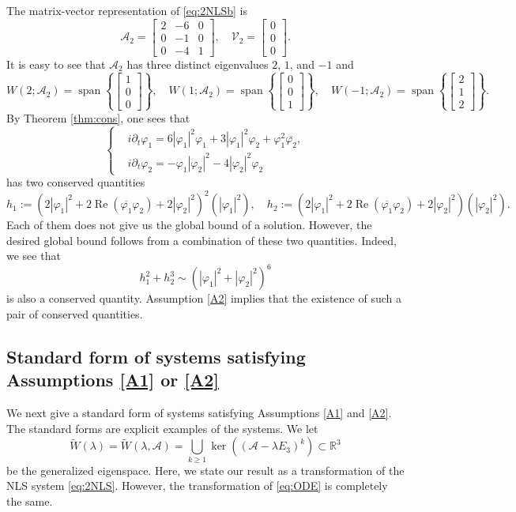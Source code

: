 \documentclass[11pt,a4paper,twosides]{amsart}
\theoremstyle{plain}
\theoremstyle{remark}
\numberwithin{equation}{section}
\newcommand{\R}{\mathbb{R}}
\renewcommand{\Re}{\operatorname{Re}}
\def\ge{\geqslant}
\DeclareMathOperator{\Span}{span}
\theoremstyle{definition}
\newcommand{\1}{{\bf 1}_{\{|x| < |t|\}}}
\newcommand{\ol}{\overline}
\renewcommand{\tilde}{\widetilde}
\begin{document}
The matrix-vector representation of \eqref{eq:2NLSb} is
\[
	\mathscr{A}_2=\begin{bmatrix}
	2 & -6 & 0 \\
	0 & -1 & 0 \\
	0 & -4 & 1
	\end{bmatrix}, \quad
	\mathscr{V}_2 = \begin{bmatrix} 0 \\ 0 \\ 0 \end{bmatrix}.
\]
It is easy to see that $\mathscr{A}_2$ has three distinct eigenvalues $2$, $1$, and $-1$ and
\[
	W(2;\mathscr{A}_2)= \Span \left\{
	\begin{bmatrix} 1 \\ 0 \\ 0 \end{bmatrix}\right\}, \quad
	W(1;\mathscr{A}_2)= \Span \left\{
	\begin{bmatrix} 0 \\ 0 \\ 1 \end{bmatrix}\right\}, \quad
	W(-1;\mathscr{A}_2)= \Span \left\{
	\begin{bmatrix} 2 \\ 1 \\ 2 \end{bmatrix}\right\}.
\]
By Theorem \ref{thm:cons}, one sees that
\[
 \left\{
  \begin{aligned}
     & i\partial_t \varphi_1  =
    6|\varphi_1|^2\varphi_1 +3|\varphi_1|^2\varphi_2 +\varphi_1^2\ol{\varphi_2},  \\
     & i\partial_t \varphi_2  =
    -\varphi_1|\varphi_2|^2 - 4 |\varphi_2|^2 \varphi_2
    \end{aligned}
  \right.
 \]
has two conserved quantities
\[
	h_1:=(2|\varphi_1|^2 + 2\Re (\overline{\varphi_1}\varphi_2)+ 2|\varphi_2|^2)^2(|\varphi_1|^2), \quad h_2:=(2|\varphi_1|^2 + 2\Re (\overline{\varphi_1}\varphi_2)+ 2|\varphi_2|^2)
	(|\varphi_2|^2).
\]
Each of them does not give us 
the global bound of a solution.
However, the desired global bound follows from
a combination of these two quantities.
Indeed, we see that
\[
	h_1^2 + h_2^3 \sim (|\varphi_1|^2+|\varphi_2|^2)^6
\]
is also a conserved quantity.
Assumption \ref{A2} implies that the existence of such a pair of conserved quantities.

\subsection{Standard form of systems satisfying Assumptions \ref{A1} or \ref{A2}}
We next give a standard form of systems
satisfying Assumptions \ref{A1} and \ref{A2}.
The standard forms are explicit examples of the systems.
We let
\[
	\tilde{W}(\lambda) = \tilde{W}(\lambda,\mathscr{A})
	= \bigcup_{k\ge1} \ker ((\mathscr{A}- \lambda E_3)^k) \subset \R^3
\]
be the generalized eigenspace.
Here, we state our result as a transformation of the NLS system \eqref{eq:2NLS}.
However, the transformation of \eqref{eq:ODE} is completely the same.
\end{document}
